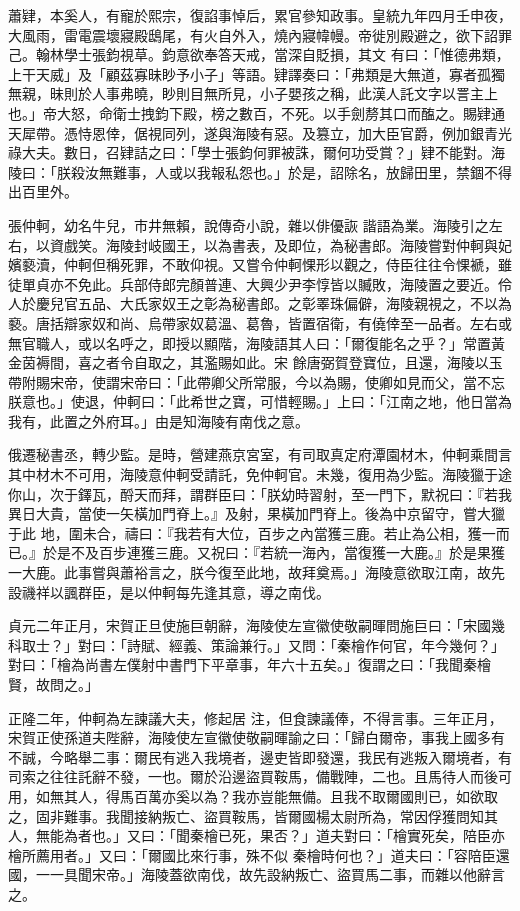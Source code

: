 \begin{pinyinscope}
 蕭肄，本奚人，有寵於熙宗，復諂事悼后，累官參知政事。皇統九年四月壬申夜，大風雨，雷電震壞寢殿鴟尾，有火自外入，燒內寢幃幔。帝徙別殿避之，欲下詔罪己。翰林學士張鈞視草。鈞意欲奉答天戒，當深自貶損，其文
 有曰：「惟德弗類，上干天威」及「顧茲寡昧眇予小子」等語。肄譯奏曰：「弗類是大無道，寡者孤獨無親，昧則於人事弗曉，眇則目無所見，小子嬰孩之稱，此漢人託文字以詈主上也。」帝大怒，命衛士拽鈞下殿，榜之數百，不死。以手劍剺其口而醢之。賜肄通天犀帶。憑恃恩倖，倨視同列，遂與海陵有惡。及篡立，加大臣官爵，例加銀青光祿大夫。數日，召肄詰之曰：「學士張鈞何罪被誅，爾何功受賞？」肄不能對。海陵曰：「朕殺汝無難事，人或以我報私怨也。」於是，詔除名，放歸田里，禁錮不得出百里外。



 張仲軻，幼名牛兒，市井無賴，說傳奇小說，雜以俳優詼
 諧語為業。海陵引之左右，以資戲笑。海陵封岐國王，以為書表，及即位，為秘書郎。海陵嘗對仲軻與妃嬪褻瀆，仲軻但稱死罪，不敢仰視。又嘗令仲軻惈形以觀之，侍臣往往令惈褫，雖徒單貞亦不免此。兵部侍郎完顏普連、大興少尹李惇皆以贓敗，海陵置之要近。伶人於慶兒官五品、大氏家奴王之彰為秘書郎。之彰睪珠偏僻，海陵親視之，不以為褻。唐括辯家奴和尚、烏帶家奴葛溫、葛魯，皆置宿衛，有僥倖至一品者。左右或無官職人，或以名呼之，即授以顯階，海陵語其人曰：「爾復能名之乎？」常置黃金茵褥間，喜之者令自取之，其濫賜如此。宋
 餘唐弼賀登寶位，且還，海陵以玉帶附賜宋帝，使謂宋帝曰：「此帶卿父所常服，今以為賜，使卿如見而父，當不忘朕意也。」使退，仲軻曰：「此希世之寶，可惜輕賜。」上曰：「江南之地，他日當為我有，此置之外府耳。」由是知海陵有南伐之意。



 俄遷秘書丞，轉少監。是時，營建燕京宮室，有司取真定府潭園材木，仲軻乘間言其中材木不可用，海陵意仲軻受請託，免仲軻官。未幾，復用為少監。海陵獵于途你山，次于鐸瓦，酹天而拜，謂群臣曰：「朕幼時習射，至一門下，默祝曰：『若我異日大貴，當使一矢橫加門脊上。』及射，果橫加門脊上。後為中京留守，嘗大獵于此
 地，圍未合，禱曰：『我若有大位，百步之內當獲三鹿。若止為公相，獲一而已。』於是不及百步連獲三鹿。又祝曰：『若統一海內，當復獲一大鹿。』於是果獲一大鹿。此事嘗與蕭裕言之，朕今復至此地，故拜奠焉。」海陵意欲取江南，故先設禨祥以諷群臣，是以仲軻每先逢其意，導之南伐。



 貞元二年正月，宋賀正旦使施巨朝辭，海陵使左宣徽使敬嗣暉問施巨曰：「宋國幾科取士？」對曰：「詩賦、經義、策論兼行。」又問：「秦檜作何官，年今幾何？」對曰：「檜為尚書左僕射中書門下平章事，年六十五矣。」復謂之曰：「我聞秦檜賢，故問之。」



 正隆二年，仲軻為左諫議大夫，修起居
 注，但食諫議俸，不得言事。三年正月，宋賀正使孫道夫陛辭，海陵使左宣徽使敬嗣暉諭之曰：「歸白爾帝，事我上國多有不誠，今略舉二事：爾民有逃入我境者，邊吏皆即發還，我民有逃叛入爾境者，有司索之往往託辭不發，一也。爾於沿邊盜買鞍馬，備戰陣，二也。且馬待人而後可用，如無其人，得馬百萬亦奚以為？我亦豈能無備。且我不取爾國則已，如欲取之，固非難事。我聞接納叛亡、盜買鞍馬，皆爾國楊太尉所為，常因俘獲問知其人，無能為者也。」又曰：「聞秦檜已死，果否？」道夫對曰：「檜實死矣，陪臣亦檜所薦用者。」又曰：「爾國比來行事，殊不似
 秦檜時何也？」道夫曰：「容陪臣還國，一一具聞宋帝。」海陵蓋欲南伐，故先設納叛亡、盜買馬二事，而雜以他辭言之。




\end{pinyinscope}

